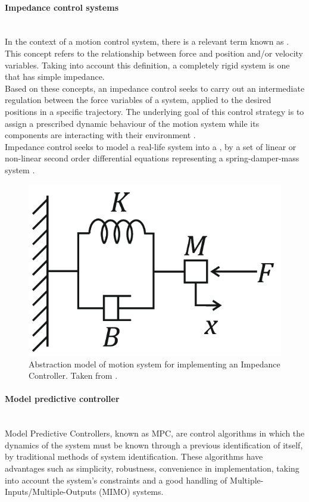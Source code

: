 \documentclass[11pt]{report} %
\newcommand{\subsubsubsection}[1]{\paragraph{#1}\mbox{}\\}
\begin{document}
\subsubsubsection{Impedance control systems}

In the context of a motion control system, there is a relevant term known as . This concept refers to the relationship between force and position and/or velocity variables. Taking into account this definition, a completely rigid system is one that has simple impedance.\\

Based on these concepts, an impedance control seeks to carry out an intermediate regulation between the force variables of a system, applied to the desired positions in a specific trajectory. The underlying goal of this control strategy is to assign a prescribed dynamic behaviour of the motion system while its components are interacting with their environment \citep{cite_canudas_theory_of_robotic_control}.\\

Impedance control seeks to model a real-life system into a , by a set of linear or non-linear second order differential equations representing a spring-damper-mass system \citep{cite_canudas_theory_of_robotic_control}.\\

\begin{figure}[H]
    \centering
    \includegraphics[width=0.4\linewidth]{assets/imgs/reference_framework/mass_damper_mass_system_for_impedance_control.png}
    \caption{Abstraction model of motion system for implementing an Impedance Controller. Taken from \citep{cite_mass_spring_damper_system_ic}.} 
    \label{fig_vuz_stereo_camera_device}
\end{figure}


\subsubsubsection{Model predictive controller}

Model Predictive Controllers, known as MPC, are control algorithms in which the dynamics of the system must be known through a previous identification of itself, by traditional methods of system identification. These algorithms have advantages such as simplicity, robustness, convenience in implementation, taking into account the system's constraints and a good handling of Multiple-Inputs/Multiple-Outputs (MIMO) systems.\\
\end{document}
